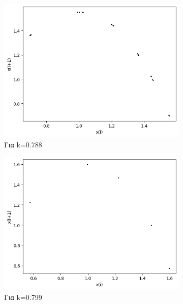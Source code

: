 \begin{figure}[h!]
	\centering
	\begin{subfigure}[b]{0.4\textwidth}
		\centering
		\includegraphics[width=\textwidth]{LateX images/graphs q16/g17}
		\caption{Για k=0.788}
		\label{f:k88}
	\end{subfigure}
	\hfill
	\begin{subfigure}[b]{0.4\textwidth}
		\centering
		\includegraphics[width=\textwidth]{LateX images/graphs q16/g18}
		\caption{Για k=0.799}
		\label{f:k89}
	\end{subfigure}
	\hfill
	\begin{subfigure}[b]{0.4\textwidth}
		\centering

\end{subfigure}
\end{figure}

